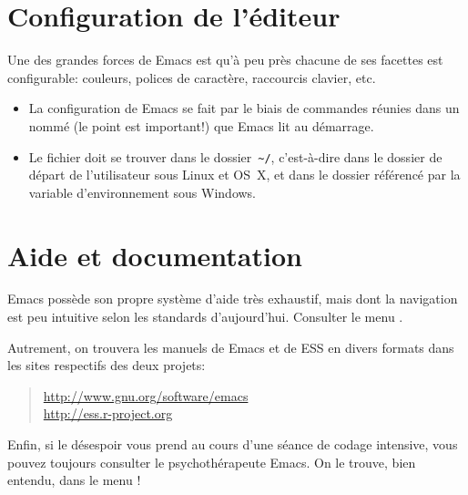 \section{Configuration de l'éditeur}
\label{emacs+ess:configuration}

Une des grandes forces de Emacs est qu'à peu près chacune de ses
facettes est configurable: couleurs, polices de caractère, raccourcis
clavier, etc.

\begin{itemize}
\item La configuration de Emacs se fait par le biais de commandes
  réunies dans un  nommé  (le point est important!) que
  Emacs lit au démarrage.
\item Le fichier  doit se trouver dans le dossier
  \,\verb=~/=, c'est-à-dire dans le dossier de départ de l'utilisateur
  sous Linux et OS~X, et dans le dossier référencé par la variable
  d'environnement  sous Windows.
\end{itemize}


\section{Aide et documentation}
\label{emacs+ess:aide}

Emacs possède son propre système d'aide très exhaustif, mais dont la
navigation est peu intuitive selon les standards d'aujourd'hui.
Consulter le menu .

Autrement, on trouvera les manuels de Emacs et de ESS en divers
formats dans les sites respectifs des deux projets:
\begin{quote}
  \url{http://www.gnu.org/software/emacs} \\
  \url{http://ess.r-project.org}
\end{quote}

Enfin, si le désespoir vous prend au cours d'une séance de codage
intensive, vous pouvez toujours consulter le psychothérapeute Emacs.
On le trouve, bien entendu, dans le menu !

